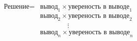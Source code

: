 \documentclass[preview]{standalone}
\begin{document}
\begin{align*}
\text{Решение}= &\text{вывод}_1 \times \text{увереность в выводе}_1\\ &\text{вывод}_2 \times \text{увереность в выводе}_2\\ &\qquad\qquad\vdots\\ &\text{вывод}_n \times \text{увереность в выводе}_n\\
\end{align*}
\end{document}

